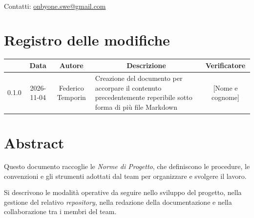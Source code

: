 \documentclass[11pt, a4paper]{article}
\begin{document}
\begin{titlepage}
    \vspace{0.5cm}
    
    {\large Contatti: \href{mailto:onbyone.swe@gmail.com}{onbyone.swe@gmail.com} }
    
\end{titlepage}

\newpage

\section*{Registro delle modifiche}

\vspace{1cm}
\begin{center}
    \renewcommand{\arraystretch}{1.5}
    \begin{tabularx}{\textwidth}{|c|c|c|X|c|}
        \hline
        \rowcolor{gray!10} 
        \multicolumn{1}{|c|}{\textbf{Versione}} & 
        \multicolumn{1}{c|}{\textbf{Data}} & 
        \multicolumn{1}{c|}{\textbf{Autore}} & 
        \multicolumn{1}{c|}{\textbf{Descrizione}} & 
        \multicolumn{1}{c|}{\textbf{Verificatore}} \\
        \hline
        0.1.0 & 2026-11-04 & Federico Temporin & Creazione del documento per accorpare il contenuto precedentemente reperibile sotto forma di più file Markdown & [Nome e cognome] \\
        \hline
    \end{tabularx}
\end{center}
\vfill
\newpage

\hypersetup{linkcolor=black}
\tableofcontents
{}
\newpage

\section{Abstract}
Questo documento raccoglie le \textit{Norme di Progetto}, che definiscono le procedure, le convenzioni e gli strumenti adottati dal team per organizzare e svolgere il lavoro.

Si descrivono le modalità operative da seguire nello sviluppo del progetto, nella gestione del relativo \textit{repository}, nella redazione della documentazione e nella collaborazione tra i membri del team.
\end{document}
